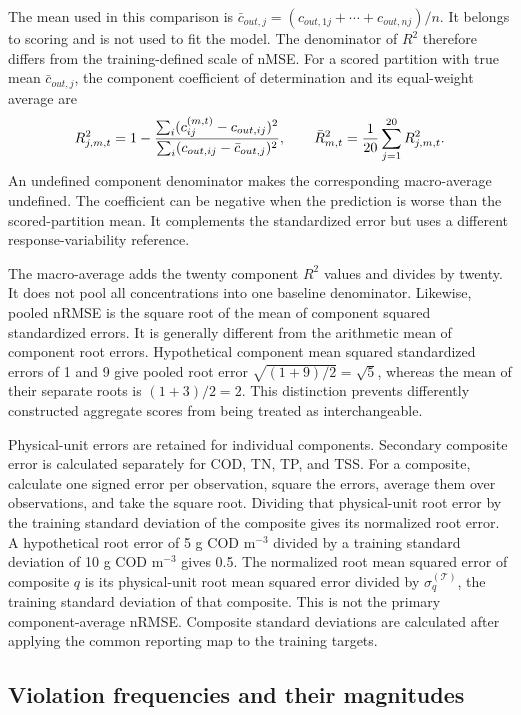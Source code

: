 The mean used in this comparison is $\bar c_{out,j}=(c_{out,1j}+\cdots+c_{out,nj})/n$. It belongs to scoring and is not used to fit the model. The denominator of $R^2$ therefore differs from the training-defined scale of nMSE. For a scored partition with true mean $\bar c_{out,j}$, the component coefficient of determination and its equal-weight average are
\begin{equation}
\equationname{Component and macro-average coefficients of determination}
R_{j,m,t}^2=1-
\frac{\sum_i(c_{ij}^{(m,t)}-c_{out,ij})^2}
{\sum_i(c_{out,ij}-\bar c_{out,j})^2},\qquad
\bar R_{m,t}^2=\frac{1}{20}\sum_{j=1}^{20}R_{j,m,t}^2.
\label{eq:projection_r_squared}
\end{equation}
An undefined component denominator makes the corresponding macro-average undefined. The coefficient can be negative when the prediction is worse than the scored-partition mean. It complements the standardized error but uses a different response-variability reference.

The macro-average adds the twenty component $R^2$ values and divides by twenty. It does not pool all concentrations into one baseline denominator. Likewise, pooled nRMSE is the square root of the mean of component squared standardized errors. It is generally different from the arithmetic mean of component root errors. Hypothetical component mean squared standardized errors of 1 and 9 give pooled root error $\sqrt{(1+9)/2}=\sqrt5$, whereas the mean of their separate roots is $(1+3)/2=2$. This distinction prevents differently constructed aggregate scores from being treated as interchangeable.

Physical-unit errors are retained for individual components. Secondary composite error is calculated separately for COD, TN, TP, and TSS. For a composite, calculate one signed error per observation, square the errors, average them over observations, and take the square root. Dividing that physical-unit root error by the training standard deviation of the composite gives its normalized root error. A hypothetical root error of 5 g COD m$^{-3}$ divided by a training standard deviation of 10 g COD m$^{-3}$ gives 0.5. The normalized root mean squared error of composite $q$ is its physical-unit root mean squared error divided by $\sigma_q^{(\mathcal{T})}$, the training standard deviation of that composite. This is not the primary component-average nRMSE. Composite standard deviations are calculated after applying the common reporting map to the training targets.

\subsection{Violation frequencies and their magnitudes}

